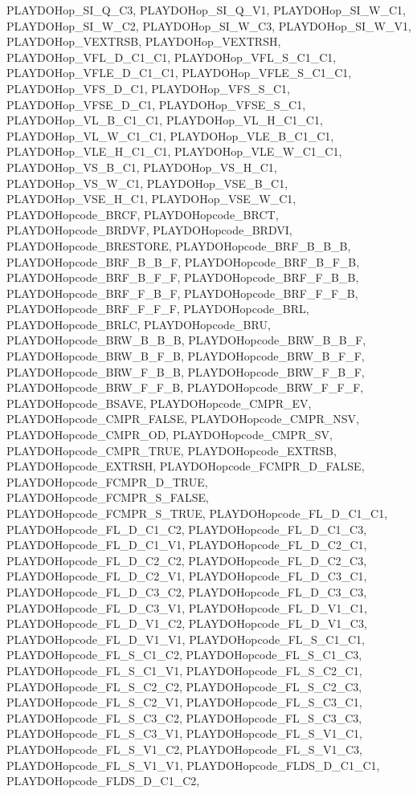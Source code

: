 PLAYDOHop\_\-SI\_\-Q\_\-C3, PLAYDOHop\_\-SI\_\-Q\_\-V1, PLAYDOHop\_\-SI\_\-W\_\-C1, PLAYDOHop\_\-SI\_\-W\_\-C2, PLAYDOHop\_\-SI\_\-W\_\-C3, PLAYDOHop\_\-SI\_\-W\_\-V1, PLAYDOHop\_\-VEXTRSB, PLAYDOHop\_\-VEXTRSH, PLAYDOHop\_\-VFL\_\-D\_\-C1\_\-C1, PLAYDOHop\_\-VFL\_\-S\_\-C1\_\-C1, PLAYDOHop\_\-VFLE\_\-D\_\-C1\_\-C1, PLAYDOHop\_\-VFLE\_\-S\_\-C1\_\-C1, PLAYDOHop\_\-VFS\_\-D\_\-C1, PLAYDOHop\_\-VFS\_\-S\_\-C1, PLAYDOHop\_\-VFSE\_\-D\_\-C1, PLAYDOHop\_\-VFSE\_\-S\_\-C1, PLAYDOHop\_\-VL\_\-B\_\-C1\_\-C1, PLAYDOHop\_\-VL\_\-H\_\-C1\_\-C1, PLAYDOHop\_\-VL\_\-W\_\-C1\_\-C1, PLAYDOHop\_\-VLE\_\-B\_\-C1\_\-C1, PLAYDOHop\_\-VLE\_\-H\_\-C1\_\-C1, PLAYDOHop\_\-VLE\_\-W\_\-C1\_\-C1, PLAYDOHop\_\-VS\_\-B\_\-C1, PLAYDOHop\_\-VS\_\-H\_\-C1, PLAYDOHop\_\-VS\_\-W\_\-C1, PLAYDOHop\_\-VSE\_\-B\_\-C1, PLAYDOHop\_\-VSE\_\-H\_\-C1, PLAYDOHop\_\-VSE\_\-W\_\-C1, PLAYDOHopcode\_\-BRCF, PLAYDOHopcode\_\-BRCT, PLAYDOHopcode\_\-BRDVF, PLAYDOHopcode\_\-BRDVI, PLAYDOHopcode\_\-BRESTORE, PLAYDOHopcode\_\-BRF\_\-B\_\-B\_\-B, PLAYDOHopcode\_\-BRF\_\-B\_\-B\_\-F, PLAYDOHopcode\_\-BRF\_\-B\_\-F\_\-B, PLAYDOHopcode\_\-BRF\_\-B\_\-F\_\-F, PLAYDOHopcode\_\-BRF\_\-F\_\-B\_\-B, PLAYDOHopcode\_\-BRF\_\-F\_\-B\_\-F, PLAYDOHopcode\_\-BRF\_\-F\_\-F\_\-B, PLAYDOHopcode\_\-BRF\_\-F\_\-F\_\-F, PLAYDOHopcode\_\-BRL, PLAYDOHopcode\_\-BRLC, PLAYDOHopcode\_\-BRU, PLAYDOHopcode\_\-BRW\_\-B\_\-B\_\-B, PLAYDOHopcode\_\-BRW\_\-B\_\-B\_\-F, PLAYDOHopcode\_\-BRW\_\-B\_\-F\_\-B, PLAYDOHopcode\_\-BRW\_\-B\_\-F\_\-F, PLAYDOHopcode\_\-BRW\_\-F\_\-B\_\-B, PLAYDOHopcode\_\-BRW\_\-F\_\-B\_\-F, PLAYDOHopcode\_\-BRW\_\-F\_\-F\_\-B, PLAYDOHopcode\_\-BRW\_\-F\_\-F\_\-F, PLAYDOHopcode\_\-BSAVE, PLAYDOHopcode\_\-CMPR\_\-EV, PLAYDOHopcode\_\-CMPR\_\-FALSE, PLAYDOHopcode\_\-CMPR\_\-NSV, PLAYDOHopcode\_\-CMPR\_\-OD, PLAYDOHopcode\_\-CMPR\_\-SV, PLAYDOHopcode\_\-CMPR\_\-TRUE, PLAYDOHopcode\_\-EXTRSB, PLAYDOHopcode\_\-EXTRSH, PLAYDOHopcode\_\-FCMPR\_\-D\_\-FALSE, PLAYDOHopcode\_\-FCMPR\_\-D\_\-TRUE, PLAYDOHopcode\_\-FCMPR\_\-S\_\-FALSE, PLAYDOHopcode\_\-FCMPR\_\-S\_\-TRUE, PLAYDOHopcode\_\-FL\_\-D\_\-C1\_\-C1, PLAYDOHopcode\_\-FL\_\-D\_\-C1\_\-C2, PLAYDOHopcode\_\-FL\_\-D\_\-C1\_\-C3, PLAYDOHopcode\_\-FL\_\-D\_\-C1\_\-V1, PLAYDOHopcode\_\-FL\_\-D\_\-C2\_\-C1, PLAYDOHopcode\_\-FL\_\-D\_\-C2\_\-C2, PLAYDOHopcode\_\-FL\_\-D\_\-C2\_\-C3, PLAYDOHopcode\_\-FL\_\-D\_\-C2\_\-V1, PLAYDOHopcode\_\-FL\_\-D\_\-C3\_\-C1, PLAYDOHopcode\_\-FL\_\-D\_\-C3\_\-C2, PLAYDOHopcode\_\-FL\_\-D\_\-C3\_\-C3, PLAYDOHopcode\_\-FL\_\-D\_\-C3\_\-V1, PLAYDOHopcode\_\-FL\_\-D\_\-V1\_\-C1, PLAYDOHopcode\_\-FL\_\-D\_\-V1\_\-C2, PLAYDOHopcode\_\-FL\_\-D\_\-V1\_\-C3, PLAYDOHopcode\_\-FL\_\-D\_\-V1\_\-V1, PLAYDOHopcode\_\-FL\_\-S\_\-C1\_\-C1, PLAYDOHopcode\_\-FL\_\-S\_\-C1\_\-C2, PLAYDOHopcode\_\-FL\_\-S\_\-C1\_\-C3, PLAYDOHopcode\_\-FL\_\-S\_\-C1\_\-V1, PLAYDOHopcode\_\-FL\_\-S\_\-C2\_\-C1, PLAYDOHopcode\_\-FL\_\-S\_\-C2\_\-C2, PLAYDOHopcode\_\-FL\_\-S\_\-C2\_\-C3, PLAYDOHopcode\_\-FL\_\-S\_\-C2\_\-V1, PLAYDOHopcode\_\-FL\_\-S\_\-C3\_\-C1, PLAYDOHopcode\_\-FL\_\-S\_\-C3\_\-C2, PLAYDOHopcode\_\-FL\_\-S\_\-C3\_\-C3, PLAYDOHopcode\_\-FL\_\-S\_\-C3\_\-V1, PLAYDOHopcode\_\-FL\_\-S\_\-V1\_\-C1, PLAYDOHopcode\_\-FL\_\-S\_\-V1\_\-C2, PLAYDOHopcode\_\-FL\_\-S\_\-V1\_\-C3, PLAYDOHopcode\_\-FL\_\-S\_\-V1\_\-V1, PLAYDOHopcode\_\-FLDS\_\-D\_\-C1\_\-C1, PLAYDOHopcode\_\-FLDS\_\-D\_\-C1\_\-C2, 
